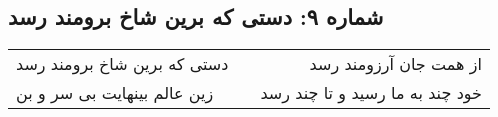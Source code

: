 \begin{center}
\section*{شماره ۹: دستی که برین شاخ برومند رسد}
\label{sec:009}
\begin{longtable}{l p{0.5cm} r}
دستی که برین شاخ برومند رسد
&&
از همت جان آرزومند رسد
\\
زین عالم بینهایت بی سر و بن
&&
خود چند به ما رسید و تا چند رسد
\\
\end{longtable}
\end{center}

